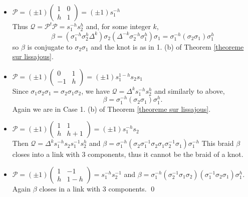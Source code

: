 \documentclass[12pt]{article}
\begin{document}
\begin{itemize}
	\item 
	${\mathcal P}=(\pm 1)\begin{pmatrix}
	1 & 0 \\
	h & 1 
	\end{pmatrix}=(\pm 1)s_1^{-h}$\\
	Thus ${\mathcal Q}={\mathcal P}^t{\mathcal P}=s_1^{-h}s_2^{h}$ and, for some integer $k$,
	$$\beta=(\sigma_1^{-h}\sigma_2^{h}\Delta^k)\sigma_2(\Delta^{-k}\sigma_2^{-h}\sigma_1^{h})\sigma_1
	=\sigma_1^{-h}(\sigma_2\sigma_1)\sigma_1^{h}
	$$
	so $\beta$ is conjugate to $\sigma_2\sigma_1$ and the knot is as in 1. (b) of Theorem \ref{theoreme sur lissajous}.
	\item 
	${\mathcal P}=(\pm 1)\begin{pmatrix}
	0 & 1 \\
	-1 & h 
	\end{pmatrix}=(\pm 1)s_1^{1-h}s_2s_1$\\
	Since $\sigma_1\sigma_2\sigma_1=\sigma_2\sigma_1\sigma_2$, we have ${\mathcal Q}=\Delta^ks_1^{-h}s_2^{h}$ and similarly to above,
	$$\beta=\sigma_1^{-h}(\sigma_2\sigma_1)\sigma_1^{h}.$$
	Again we are in Case 1. (b) of Theorem \ref{theoreme sur lissajous}.
	\item 
	${\mathcal P}=(\pm 1)\begin{pmatrix}
	1 & 1 \\
	h & h+1 
	\end{pmatrix}=(\pm 1)s_1^{-h}s_2$\\
	Then ${\mathcal Q}=\Delta^ks_1^{-h}s_2s_1^{-1}s_2^{h}$ and
	$\beta=\sigma_1^{-h}(\sigma_2\sigma_1^{-1}\sigma_2\sigma_1\sigma_2^{-1}\sigma_1)\sigma_1^{-h}$
	This braid $\beta$ closes into a link with $3$ components, thus it cannot be the braid of a knot.
	
	\item 
	${\mathcal P}=(\pm 1)\begin{pmatrix}
	1 & -1 \\
	h & 1-h
	\end{pmatrix}=s_1^{-h}s_2^{-1}$ and 
	$\beta=\sigma_1^{-h}(\sigma_2^{-1}\sigma_1\sigma_2)(\sigma_1^{-1}\sigma_2\sigma_1)\sigma_1^{h}$.
	Again $\beta$ closes in a link with $3$ components. \qed
\end{itemize}
\end{document}
